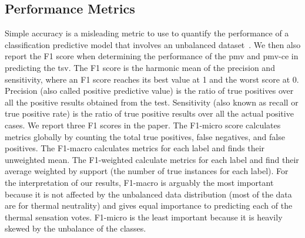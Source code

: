 \subsection{Performance Metrics}\label{subsec:performance-metrics}
Simple accuracy is a misleading metric to use to quantify the performance of a classification predictive model that involves an unbalanced dataset~\cite{Chawla2005}.
We then also report the F1 score when determining the performance of the \ac{pmv} and \ac{pmv-ce} in predicting the \ac{tsv}.
The F1 score is the harmonic mean of the precision and sensitivity, where an F1 score reaches its best value at 1 and the worst score at 0.
Precision (also called positive predictive value) is the ratio of true positives over all the positive results obtained from the test. 
Sensitivity (also known as recall or true positive rate) is the ratio of true positive results over all the actual positive cases.
We report three F1 scores in the paper.
The F1-micro score calculates metrics globally by counting the total true positives, false negatives, and false positives.
The F1-macro calculates metrics for each label and finds their unweighted mean.
The F1-weighted calculate metrics for each label and find their average weighted by support (the number of true instances for each label).
For the interpretation of our results, F1-macro is arguably the most important because it is not affected by the unbalanced data distribution (most of the data are for thermal neutrality) and gives equal importance to predicting each of the thermal sensation votes. 
F1-micro is the least important because it is heavily skewed by the unbalance of the classes.